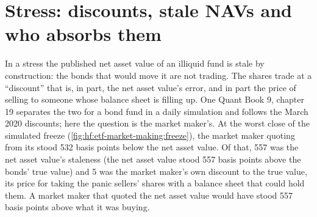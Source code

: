 \begin{omfigure}

\label{fig:hf:etf-market-making:freeze}
\end{omfigure}

\section{Stress: discounts, stale NAVs and who absorbs them}

In a stress the published net asset value of an illiquid fund is stale by construction: the bonds that would move it are not trading. The shares
trade at a ``discount'' that is, in part, the net asset value's error, and in part the price of selling to someone whose balance sheet is filling
up. One Quant Book 9, chapter 19 separates the two for a bond fund in a daily simulation and follows the March 2020 discounts; here the question is
the market maker's. At the worst close of the simulated freeze (\cref{fig:hf:etf-market-making:freeze}), the market maker quoting from its  stood 532 basis points below the net asset value. Of that, 557 was the net asset value's staleness (the net asset value stood 557 basis
points above the bonds' true value) and 5 was the market maker's own discount to the true value, its price for taking the panic sellers' shares with
a balance sheet that could hold them. A market maker that quoted the net asset value would have stood 557 basis points above what it was buying.

